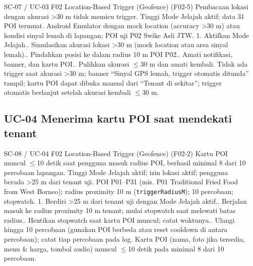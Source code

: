 \renewcommand{\tcactual}{Sesuai ekspektasi pada perangkat Android (Filter akurasi >30 m lolos (\texttt{01-geofence})). Tidak ada trigger saat akurasi >30 m; banner ``Sinyal GPS lemah, trigger otomatis ditunda'' tampil; kartu POI dapat dibuka manual dari ``Tenant di sekitar''; trigger otomatis berlanjut setelah akurasi kembali \(\le\)30 m.}
{SC-07 / UC-03}
{F02 Location-Based Trigger (Geofence)}
{(F02-5) Pembacaan lokasi dengan akurasi >30 m tidak memicu trigger.}
{Tinggi}
{Mode Jelajah aktif; data 31 POI termuat.}
{Android Emulator dengan mock location (accuracy >30 m) atau kondisi sinyal lemah di lapangan; POI uji P02 Swike Asli JTW.}
{1. Aktifkan Mode Jelajah.. Simulasikan akurasi lokasi >30 m (mock location atau area sinyal lemah).. Pindahkan posisi ke dalam radius 10 m POI P02.. Amati notifikasi, banner, dan kartu POI.. Pulihkan akurasi \(\le\)30 m dan amati kembali.}
{Tidak ada trigger saat akurasi >30 m; banner ``Sinyal GPS lemah, trigger otomatis ditunda'' tampil; kartu POI dapat dibuka manual dari ``Tenant di sekitar''; trigger otomatis berlanjut setelah akurasi kembali \(\le\)30 m.}

\subsection*{UC-04 Menerima kartu POI saat mendekati tenant}

\renewcommand{\tcactual}{Sesuai ekspektasi pada perangkat Android (Logika proximity 10 m lolos (\texttt{01-geofence})). Kartu POI (nama, foto jika tersedia, menu \& harga, tombol audio) muncul \(\le\)10 detik pada minimal 8 dari 10 percobaan.}
{SC-08 / UC-04}
{F02 Location-Based Trigger (Geofence)}
{(F02-2) Kartu POI muncul \(\le\)10 detik saat pengguna masuk radius POI, berhasil minimal 8 dari 10 percobaan lapangan.}
{Tinggi}
{Mode Jelajah aktif; izin lokasi aktif; pengguna berada >25 m dari tenant uji.}
{POI P01--P31 (mis. P01 Traditional Fried Food from West Borneo); radius proximity 10 m (\texttt{triggerRadiusM}); 10 percobaan; stopwatch.}
{1. Berdiri >25 m dari tenant uji dengan Mode Jelajah aktif.. Berjalan masuk ke radius proximity 10 m tenant; mulai stopwatch saat melewati batas radius.. Hentikan stopwatch saat kartu POI muncul; catat waktunya.. Ulangi hingga 10 percobaan (gunakan POI berbeda atau reset cooldown di antara percobaan); catat tiap percobaan pada log.}
{Kartu POI (nama, foto jika tersedia, menu \& harga, tombol audio) muncul \(\le\)10 detik pada minimal 8 dari 10 percobaan.}

